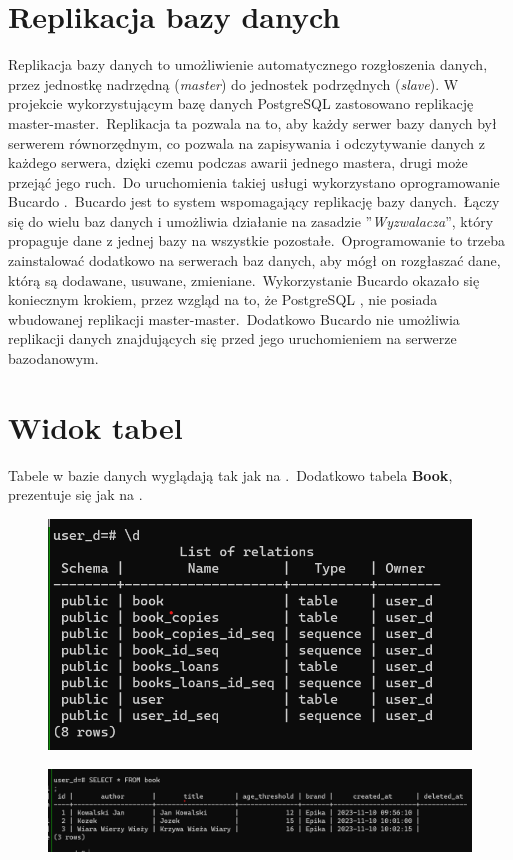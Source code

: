 \section{Replikacja bazy danych}
Replikacja bazy danych to umożliwienie automatycznego rozgłoszenia danych, przez jednostkę nadrzędną (\textit{master}) do jednostek podrzędnych (\textit{slave}). W projekcie wykorzystującym bazę danych PostgreSQL \cite{Pos2023} zastosowano replikację master-master.\ Replikacja ta pozwala na to, aby każdy serwer bazy danych był serwerem równorzędnym, co pozwala na zapisywania i odczytywanie danych z każdego serwera, dzięki czemu podczas awarii jednego mastera, drugi może przejąć jego ruch.\ Do uruchomienia takiej usługi wykorzystano oprogramowanie Bucardo \cite{Buc2023}.\ Bucardo jest to system wspomagający replikację bazy danych.\ Łączy się do wielu baz danych i umożliwia działanie na zasadzie ''\textit{Wyzwalacza}'', który propaguje dane z jednej bazy na wszystkie pozostałe.\ Oprogramowanie to trzeba zainstalować dodatkowo na serwerach baz danych, aby mógł on rozgłaszać dane, którą są dodawane, usuwane, zmieniane.\ Wykorzystanie Bucardo okazało się koniecznym krokiem, przez wzgląd na to, że PostgreSQL \cite{Pos2023}, nie posiada wbudowanej replikacji master-master.\ Dodatkowo Bucardo nie umożliwia replikacji danych znajdujących się przed jego uruchomieniem na serwerze bazodanowym.


\section{Widok tabel}
Tabele w bazie danych wyglądają tak jak na .\ Dodatkowo tabela \textbf{Book}, prezentuje się jak na .

\begin{figure}[H]
    \centering
    \includegraphics[width=\textwidth]{images/db1}
    \label{fig:db1}
\end{figure}

\begin{figure}[H]
    \centering
    \includegraphics[width=\textwidth]{images/db2}
    \label{fig:db2}
\end{figure}
